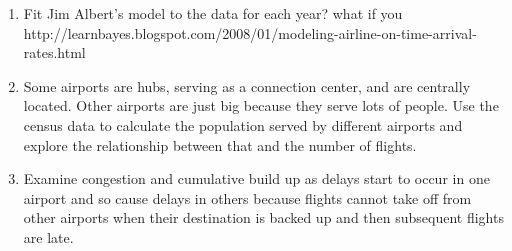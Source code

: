 \documentclass{article}
\begin{document}
\begin{enumerate}
\item Fit Jim Albert's model to the data for each year?
what if you 
http://learnbayes.blogspot.com/2008/01/modeling-airline-on-time-arrival-rates.html

\item Some airports are hubs, serving as a connection center,
 and are centrally located.
 Other airports are just big because they serve lots of people.
 Use the census data to calculate the population served by
 different airports and explore the relationship
  between that and the number of flights.

\item Examine congestion and cumulative build up as delays start to
  occur in one airport and so cause delays in others
because flights cannot take off from other airports when
their destination is backed up and then subsequent flights are 
late.

\end{enumerate}
\end{document}
